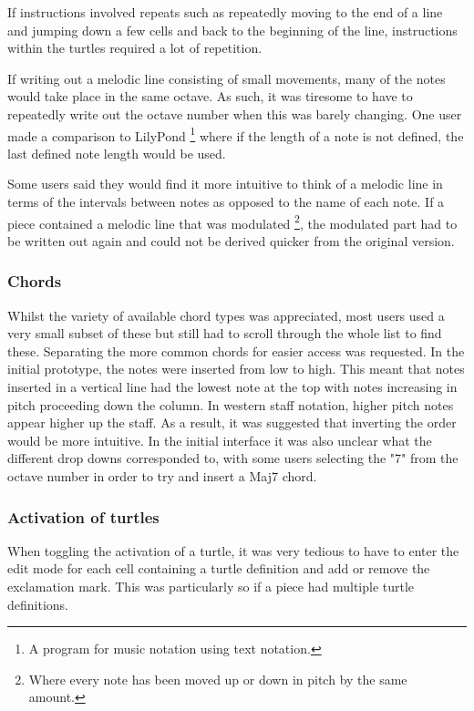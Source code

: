 If instructions involved repeats such as repeatedly moving to the end of a line and jumping down a few cells and back to the beginning of the line, instructions within the turtles required a lot of repetition.

If writing out a melodic line consisting of small movements, many of the notes would take place in the same octave. As such, it was tiresome to have to repeatedly write out the octave number when this was barely changing. One user made a comparison to LilyPond \footnote{A program for music notation using text notation.} \cite{sandberg:lily} where if the length of a note is not defined, the last defined note length would be used.

Some users said they would find it more intuitive to think of a melodic line in terms of the intervals between notes as opposed to the name of each note. If a piece contained a melodic line that was modulated \footnote{Where every note has been moved up or down in pitch by the same amount.}, the modulated part had to be written out again and could not be derived quicker from the original version.

\subsubsection{Chords}

Whilst the variety of available chord types was appreciated, most users used a very small subset of these but still had to scroll through the whole list to find these. Separating the more common chords for easier access was requested. In the initial prototype, the notes were inserted from low to high. This meant that notes inserted in a vertical line had the lowest note at the top with notes increasing in pitch proceeding down the column. In western staff notation, higher pitch notes appear higher up the staff. As a result, it was suggested that inverting the order would be more intuitive. In the initial interface it was also unclear what the different drop downs corresponded to, with some users selecting the "7" from the octave number in order to try and insert a Maj7 chord.

\subsubsection{Activation of turtles}

When toggling the activation of a turtle, it was very tedious to have to enter the edit mode for each cell containing a turtle definition and add or remove the exclamation mark. This was particularly so if a piece had multiple turtle definitions.


